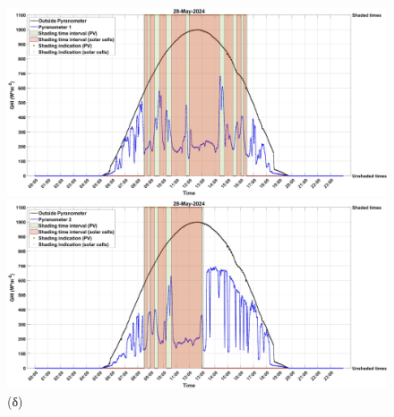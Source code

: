 \documentclass[12pt, a4paper]{report} %
\begin{document}
\begin{figure}[H]
\begin{adjustwidth}{-0.7cm}{0cm}
        \begin{minipage}[c]{0.5\textwidth}
            \centering
            \includegraphics[scale=0.085]{28_May_GHI_1.jpg}
            \caption*{\hspace{35pt}(γ)}{}
        \end{minipage}
        \hfill
        \begin{minipage}[c]{0.5\textwidth}
            \centering
            \includegraphics[scale=0.085]{28_May_GHI_2.jpg}
            \caption*{\hspace{35pt}(δ)}{}
        \end{minipage}

        \medskip


\end{adjustwidth}
\end{figure}
\end{document}
